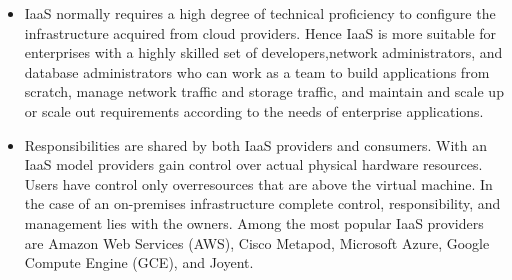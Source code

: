 \documentclass[a4paper, 12pt]{article}
\begin{document}
\begin{itemize}
\begin{itemize}
\item
IaaS  normally  requires  a  high  degree  of  technical  proficiency  to  configure  the infrastructure  acquired  from  cloud  providers.  Hence  IaaS  is  more  suitable  for enterprises  with  a  highly  skilled  set  of  developers,network  administrators,  and database administrators who can work as a team to build applications from scratch, manage network traffic and storage traffic, and maintain and scale up or scale out requirements according to the needs of enterprise applications.
\item
Responsibilities  are  shared  by  both  IaaS  providers  and  consumers.  With  an  IaaS model providers gain control over actual physical hardware resources. Users have control only overresources that are above the virtual machine. In the case of an on-premises infrastructure complete control, responsibility, and management lies with the  owners.  Among  the  most  popular  IaaS  providers  are  Amazon  Web  Services (AWS),  Cisco  Metapod,  Microsoft  Azure,  Google  Compute  Engine  (GCE),  and Joyent.
\end{itemize}
\end{itemize}
\end{document}
